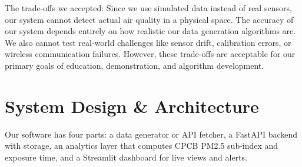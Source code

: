 \documentclass[12pt]{report}
\begin{document}
The trade-offs we accepted: Since we use simulated data instead of real sensors, our system cannot detect actual air quality in a physical space. The accuracy of our system depends entirely on how realistic our data generation algorithms are. We also cannot test real-world challenges like sensor drift, calibration errors, or wireless communication failures. However, these trade-offs are acceptable for our primary goals of education, demonstration, and algorithm development.

\section{System Design \& Architecture}
Our software has four parts: a data generator or API fetcher, a FastAPI backend with storage, an analytics layer that computes CPCB PM2.5 sub-index and exposure time, and a Streamlit dashboard for live views and alerts.
\end{document}
